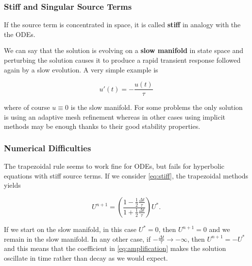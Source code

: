 \documentclass{beamer}
\renewcommand{\d}{\Delta}
\renewcommand{\emph}[1]{\textcolor{tum}{\textbf{#1}}}
\begin{document}
\begin{frame}
	\frametitle{Stiff and Singular Source Terms}

	If the source term is concentrated in space, it is called \emph{stiff} in analogy with the the ODEs.

	We can say that the solution is evolving on a \emph{slow manifold} in state space and perturbing the solution causes it to produce a rapid transient response followed again by a slow evolution. A very simple example is

	\begin{equation}\label{eq:stiff}
		u'(t)=-\frac{u(t)}{\tau}
	\end{equation}

	where of course $u\equiv0$ is the slow manifold. For some problems the only solution is using an adaptive mesh refinement whereas in other cases using implicit methods may be enough thanks to their good stability properties.
\end{frame}

\begin{frame}
	\frametitle{Numerical Difficulties}
	The trapezoidal rule seems to work fine for ODEs, but fails for hyperbolic equations with stiff source terms. If we consider \eqref{eq:stiff}, the trapezoidal methods yields

	\begin{equation}\label{eq:amplification}
		U^{n+1} = \left(\frac{1-\frac{1}{2}\frac{\d t}{\tau}}{1+\frac{1}{2}\frac{\d t}{\tau}}\right)U^*.
	\end{equation}

	If we start on the slow manifold, in this case $U^*=0$, then $U^{n+1}=0$ and we remain in the slow manifold. In any other case, if $-\frac{\d t}{\tau}\rightarrow-\infty$, then $U^{n+1}=-U^*$ and this means that the coefficient in \eqref{eq:amplification} makes the solution oscillate in time rather than decay as we would expect.
\end{frame}
\end{document}
